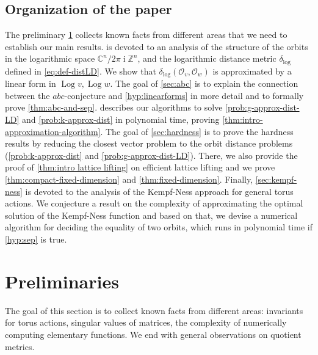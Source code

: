 \documentclass[a4paper,USenglish,cleveref,numberwithinsect]{lipics-v2021}
\DeclareMathOperator{\ii}{i}
\DeclareMathOperator{\Log}{Log}
\newcommand{\distLD}{\delta_{\log}}
\newcommand{\CC}{\mathbb{C}}
\newcommand{\ZZ}{\mathbb{Z}}
\newcommand{\OO}{\ensuremath{\mathcal{O}}}
\newcommand{\abc}{\texorpdfstring{$abc$}{abc}}
\numberwithin{equation}{section}
\begin{document}
\subsection{Organization of the paper}
The preliminary \cref{sec:prelim} collects known facts from
different areas that we need to establish our main results.
 is devoted to an analysis of the structure of the orbits
in the logarithmic space $\CC^n/2\pi\ii\ZZ^n$, and the
logarithmic distance metric $\distLD$ defined in \cref{eq:def-distLD}.
We show that $\distLD(\OO_v,\OO_w)$ is approximated by a linear form in $\Log v,\Log w$.
The goal of \cref{sec:abc} is to explain the connection
between the \abc-conjecture and \cref{hyp:linearforms}
in more detail and to formally prove \cref{thm:abc-and-sep}.
 describes our algorithms to solve \cref{prob:g-approx-dist-LD}
and \cref{prob:k-approx-dist} in polynomial time,
proving \cref{thm:intro-approximation-algorithm}.
The goal of \cref{sec:hardness} is to prove the hardness results by reducing
the closest vector problem %
to the orbit distance problems (\cref{prob:k-approx-dist} and \cref{prob:g-approx-dist-LD}).
There, we also provide the proof of \cref{thm:intro lattice lifting} on efficient lattice lifting
and we prove
\cref{thm:compact-fixed-dimension} and \cref{thm:fixed-dimension}.
Finally, \cref{sec:kempf-ness} is devoted to the analysis of
the Kempf-Ness approach for general torus actions.
We conjecture a result on the complexity of approximating the optimal solution of the Kempf-Ness function and based on that, we devise a numerical algorithm for deciding the equality of two orbits,
which runs in polynomial time if \cref{hyp:sep} is true.

\section{Preliminaries}\label{sec:prelim}

The goal of this section is to collect known facts from
different areas: invariants for torus actions, singular values of matrices,
the complexity of numerically computing elementary functions.
We end with general observations on quotient metrics.
\end{document}
